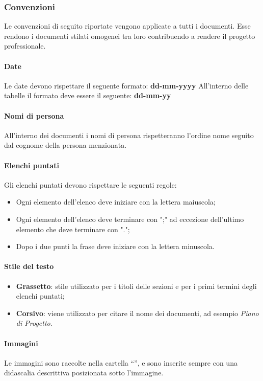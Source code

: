 \subsubsection{Convenzioni}
Le convenzioni di seguito riportate vengono applicate a tutti i documenti.
Esse rendono i documenti stilati omogenei tra loro contribuendo a rendere il progetto professionale.

\paragraph{Date}
Le date devono rispettare il seguente formato: \textbf{dd-mm-yyyy}
All'interno delle tabelle il formato deve essere il seguente: \textbf{dd-mm-yy}
\paragraph{Nomi di persona}
All'interno dei documenti i nomi di persona rispetteranno l'ordine nome seguito dal cognome della persona menzionata.

\paragraph{Elenchi puntati}
Gli elenchi puntati devono rispettare le seguenti regole:
\begin{itemize} 
    \item Ogni elemento dell'elenco deve iniziare con la lettera maiuscola;
    \item Ogni elemento dell'elenco deve terminare con ";" ad eccezione dell'ultimo elemento
    che deve terminare con "."; 
    \item Dopo i due punti la frase deve iniziare con la lettera minuscola.
\end{itemize}

\paragraph{Stile del testo}
\begin{itemize} 
    \item \textbf{Grassetto}: stile utilizzato per i titoli delle sezioni e per i primi termini degli elenchi puntati;
    \item \textbf{Corsivo}: viene utilizzato per citare il nome dei documenti, ad esempio \textit{Piano di Progetto}. 
\end{itemize}

\paragraph{Immagini}
Le immagini sono raccolte nella cartella “”, e sono inserite sempre con una didascalia descrittiva posizionata sotto l’immagine.

